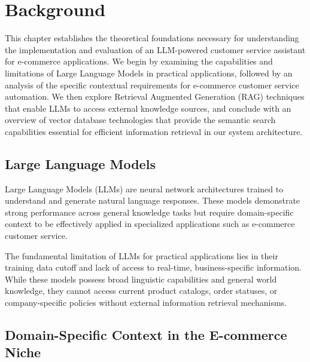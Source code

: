 \chapter{Background}
\label{cha:background}

This chapter establishes the theoretical foundations necessary for understanding the implementation and evaluation of an LLM-powered customer service assistant for e-commerce applications. We begin by examining the capabilities and limitations of Large Language Models in practical applications, followed by an analysis of the specific contextual requirements for e-commerce customer service automation. We then explore Retrieval Augmented Generation (RAG) techniques that enable LLMs to access external knowledge sources, and conclude with an overview of vector database technologies that provide the semantic search capabilities essential for efficient information retrieval in our system architecture.

\section{Large Language Models}

Large Language Models (LLMs) are neural network architectures trained to understand and generate natural language responses. These models demonstrate strong performance across general knowledge tasks but require domain-specific context to be effectively applied in specialized applications such as e-commerce customer service.

The fundamental limitation of LLMs for practical applications lies in their training data cutoff and lack of access to real-time, business-specific information. While these models possess broad linguistic capabilities and general world knowledge, they cannot access current product catalogs, order statuses, or company-specific policies without external information retrieval mechanisms.

\section{Domain-Specific Context in the E-commerce Niche}

